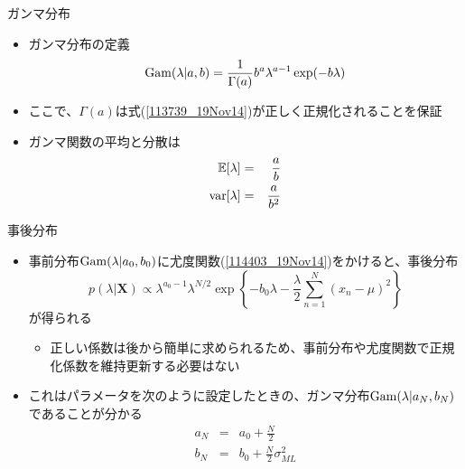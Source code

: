 \begin{frame}{ガンマ分布}
 \begin{itemize}
  \item ガンマ分布の定義
        \begin{equation}
         {\rm Gam}(\lambda|a,b) = \frac{1}{\Gamma(a)}b^a\lambda^{a-1}\exp(-b\lambda)\label{113739_19Nov14}
        \end{equation}
  \item ここで、$\Gamma(a)$は式(\ref{113739_19Nov14})が正しく正規化されることを保証
  \item ガンマ関数の平均と分散は
        \begin{eqnarray}
         \mathbb{E}[\lambda] &=& \frac{a}{b}\\
         {\rm var}[\lambda]& =& \frac{a}{b^2}
        \end{eqnarray}
 \end{itemize}
\end{frame}

\begin{frame}{事後分布}
 \begin{itemize}
  \item 事前分布${\rm Gam}(\lambda|a_0,b_0)$に尤度関数(\ref{114403_19Nov14})をかけると、事後分布
        \begin{equation}
         p(\lambda|\bm{X}) \propto \lambda^{a_0-1}\lambda^{N/2}\exp\left\{-b_0\lambda-\frac{\lambda}{2}\sum_{n=1}^{N}(x_n-\mu)^2\right\}\label{114734_19Nov14}
        \end{equation}
        が得られる
        \begin{itemize}
         \item 正しい係数は後から簡単に求められるため、事前分布や尤度関数で正規化係数を維持更新する必要はない
        \end{itemize}
  \item これはパラメータを次のように設定したときの、ガンマ分布${\rm Gam}(\lambda|a_N,b_N)$であることが分かる
        \begin{eqnarray}
         a_N&=& a_0 + \frac{N}{2}\label{115004_19Nov14}\\
         b_N%
         &= & b_0+\frac{N}{2}\sigma^2_{ML}\label{115046_19Nov14}
        \end{eqnarray}
 \end{itemize}
\end{frame}

